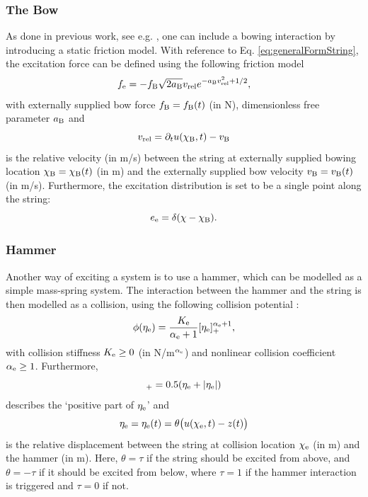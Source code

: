 \documentclass{article}
\begin{document}
\subsubsection{The Bow}
As done in previous work, see e.g. \cite{Willemsen2019}, one can include a bowing interaction by introducing a static friction model. With reference to Eq. \eqref{eq:generalFormString}, the excitation force can be defined using the following friction model \cite{theBible}
\begin{equation}\label{eq:bowForce}
    f_\text{e} = - f_{\text{B}}\sqrt{2a_{\text{B}}}v_\text{rel} e^{-a_{\text{B}}v_\text{rel}^2+1/2},
\end{equation}
with externally supplied bow force $f_{\text{B}} = f_{\text{B}}(t)$ (in N), dimensionless free parameter $a_{\text{B}}$ and 
\begin{equation}\label{eq:vrel}
    v_\text{rel} = \partial_t u(\chi_{\text{B}}, t) - v_{\text{B}}
\end{equation}
is the relative velocity (in m/s) between the string at externally supplied bowing location $\chi_{\text{B}} = \chi_{\text{B}}(t)$ (in m) and the externally supplied bow velocity $v_{\text{B}} = v_{\text{B}}(t)$ (in m/s).
Furthermore, the excitation distribution is set to be a single point along the string:
\begin{equation}\label{eq:bowDistribution}
    e_\text{e} = \delta(\chi - \chi_{\text{B}}).
\end{equation}

\subsubsection{Hammer}
Another way of exciting a system is to use a hammer, which can be modelled as a simple mass-spring system. The interaction between the hammer and the string is then modelled as a collision, using the following collision potential \cite{Hertz1881}:
\begin{equation}\label{eq:potential}
    \phi(\eta_{\text{e}}) = \frac{K_{\text{e}}}{\alpha_{\text{e}}+1}[\eta_{\text{e}}]_+^{\alpha_{\text{e}}+1},
\end{equation}
with collision stiffness $K_{\text{e}} \geq 0$ (in N/m$^{\alpha_{\text{e}}}$) and nonlinear collision coefficient $\alpha_{\text{e}} \geq 1$. Furthermore, 
\begin{equation}
    [\eta_\etxt]_+ = 0.5 (\eta_\etxt + |\eta_\etxt|)
\end{equation} 
describes the `positive part of $\eta_{\text{e}}$' and
\begin{equation}
    \eta_{\text{e}} = \eta_{\text{e}}(t) = \theta\big(u(\chi_{\text{e}}, t) - z(t)\big)
\end{equation}
is the relative displacement between the string at collision location $\chi_{\text{e}}$ (in m) and the hammer (in m). Here, $\theta = \tau$ if the string should be excited from above, and $\theta = -\tau$ if it should be excited from below, where $\tau = 1$ if the hammer interaction is triggered and $\tau = 0$ if not.  
\end{document}
